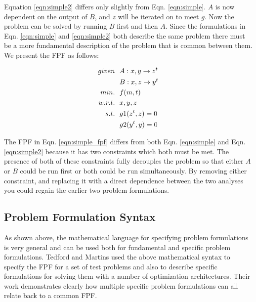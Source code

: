     Equation \ref{eqn:simple2} differs only slightly from Eqn. \ref{eqn:simple}. $A$ is now dependent on the output of $B$, 
    and $z$ will be iterated on to meet $g$. Now the problem can be solved by running $B$ first and then $A$.
    Since the formulations in Eqn. \ref{eqn:simple} and \ref{eqn:simple2} both describe the same problem 
    there must be a more fundamental description of the problem that is common between them. We present the FPF as follows: 

    \begin{align}
        given & \ \ A: {x,y} \rightarrow {z^t}
        \\      & \ \ B: {x,z} \rightarrow {y^t}
        \\min. &\ \ f(m,t) \notag
        \\w.r.t. & \ \ x,y,z \notag
        \\s.t. & \ \ g1(z^t,z) = 0 \notag
        \\     & \ \ g2(y^t,y) = 0
        \label{eqn:simple_fpf}
    \end{align}

    The FPF in Eqn. \ref{eqn:simple_fpf} differs from both Eqn. \ref{eqn:simple} and Eqn. \ref{eqn:simple2} because it has 
    two constraints which both must be met. The presence of both of these constraints fully decouples the problem so that 
    either $A$ or $B$ could be run first or both could be run simultaneously. By removing either constraint, and replacing 
    it with a direct dependence between the two analyses you could regain the earlier two problem formulations. 

    \subsection{Problem Formulation Syntax}

    As shown above, the mathematical language for specifying problem formulations is very general and can be used both for 
    fundamental and specific problem formulations. Tedford and Martins used the above mathematical syntax to specify the 
    FPF for a set of test problems and also to describe specific formulations for solving them with a 
    number of optimization architectures\cite{Tedford2009}. Their work demonstrates clearly how multiple specific 
    problem formulations can all relate back to a common FPF. 
    
